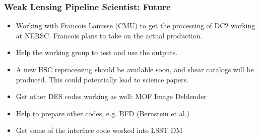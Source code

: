 \documentclass{beamer}
\begin{document}
\frame
{

    \frametitle{Weak Lensing Pipeline Scientist: Future}


    \begin{itemize}

        \item Working with Francois Lanusse (CMU) to get the processing
            of DC2 working at NERSC. Francois plans to take on the
            actual production.

        \item Help the working group to test and use the outputs.

        \item A new HSC reprocessing should be available soon, and
            shear catalogs will be produced.  This could 
            potentially lead to science papers.

        \item Get other DES codes working as well: MOF Image Deblender

        \item Help to prepare other codes, e.g. BFD (Bernstein et al.)

        \item Get some of the interface code worked into LSST DM

    \end{itemize}
}
\end{document}
